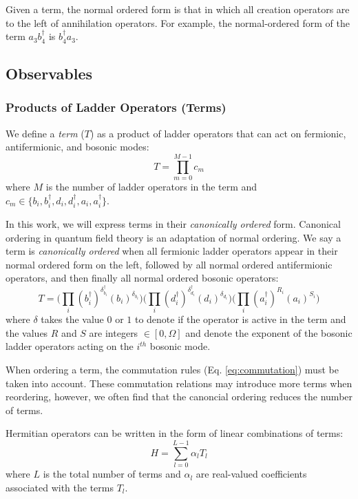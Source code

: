 Given a term, the normal ordered form is that in which all creation operators are to the left of annihilation operators.
For example, the normal-ordered form of the term $a_3 b_4^\dagger$ is $b_4^\dagger a_3$.

\subsection{Observables}
\label{subsec:observables}

\subsubsection{Products of Ladder Operators (Terms)}

We define a \textit{term} ($T$) as a product of ladder operators that can act on fermionic, antifermionic, and bosonic modes:
\begin{equation}
    \label{eq:term}
    T = \prod_{m=0}^{M-1} c_m
\end{equation}
where $M$ is the number of ladder operators in the term and $c_m \in \{b_i, b_i^\dagger, d_i, d_i^\dagger, a_i, a_i^\dagger\}$.


In this work, we will express terms in their \emph{canonically ordered} form.
Canonical ordering in quantum field theory is an adaptation of normal ordering.
We say a term is \textit{canonically ordered} when all fermionic ladder operators appear in their normal ordered form on the left, followed by all normal ordered antifermionic operators, and then finally all normal ordered bosonic operators:
\begin{equation}
    T = \Big( \prod_i (b_i^\dagger)^{\delta_{b_i}^{\dagger}} (b_i)^{\delta_{b_i}} \Big) \Big( \prod_i (d_i^\dagger)^{\delta_{d_i}^{\dagger}} (d_i)^{\delta_{d_i}} \Big)   \Big( \prod_i (a_i^\dagger)^{R_i}(a_i)^{S_i} \Big) 
\end{equation}
where $\delta$ takes the value $0$ or $1$ to denote if the operator is active in the term and the values $R$ and $S$ are integers $\in [0, \Omega]$ and denote the exponent of the bosonic ladder operators acting on the $i^{th}$ bosonic mode.

When ordering a term, the commutation rules (Eq. \ref{eq:commutation}) must be taken into account.
These commutation relations may introduce more terms when reordering, however, we often find that the canoncial ordering reduces the number of terms.


Hermitian operators can be written in the form of linear combinations of terms:
\begin{equation}
    \label{eq:lclo}
    H = \sum_{l=0}^{L-1} \alpha_l T_l
\end{equation}
where $L$ is the total number of terms and $\alpha_l$ are real-valued  coefficients associated with the terms $T_l$.
